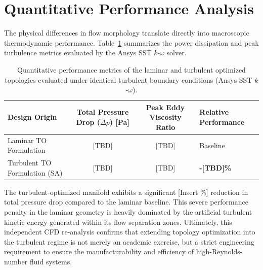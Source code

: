 \section{Quantitative Performance Analysis}
\label{sec:app_lam_vs_turb_metrics}
The physical differences in flow morphology translate directly into macroscopic thermodynamic performance. Table~\ref{tab:app_laminar_turbulent_metrics} summarizes the power dissipation and peak turbulence metrics evaluated by the Ansys SST $k$-$\omega$ solver.

\begin{table}[!ht]
	\centering
	\footnotesize
	\caption{Quantitative performance metrics of the laminar and turbulent optimized topologies evaluated under identical turbulent boundary conditions (Ansys SST $k$-$\omega$).}
	\label{tab:app_laminar_turbulent_metrics}
	\renewcommand{\arraystretch}{1.2}
	\begin{tabularx}{\textwidth}{l c c X}
		\hline
		\textbf{Design Origin} & \textbf{Total Pressure Drop ($\Delta p$) [Pa]} & \textbf{Peak Eddy Viscosity Ratio} & \textbf{Relative Performance} \\
		\hline
		Laminar TO Formulation & [TBD] & [TBD] & Baseline \\
		Turbulent TO Formulation (SA) & [TBD] & [TBD] & \textbf{-[TBD]\%} \\
		\hline
	\end{tabularx}
\end{table}

The turbulent-optimized manifold exhibits a significant [Insert \%] reduction in total pressure drop compared to the laminar baseline. This severe performance penalty in the laminar geometry is heavily dominated by the artificial turbulent kinetic energy generated within its flow separation zones. Ultimately, this independent CFD re-analysis confirms that extending topology optimization into the turbulent regime is not merely an academic exercise, but a strict engineering requirement to ensure the manufacturability and efficiency of high-Reynolds-number fluid systems.